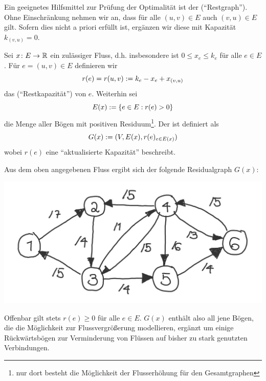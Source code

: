 Ein geeignetes Hilfsmittel zur Prüfung der Optimalität ist der  (\enquote{Restgraph}). Ohne Einschränkung nehmen wir an, dass für alle $(u,v) \in E$ auch $(v,u) \in E$ gilt. Sofern dies nicht a priori erfüllt ist, ergänzen wir diese mit Kapazität $k_{(v,u)} = 0$.

\begin{definition}
	Sei $\abb{x}{E}{\R}$ ein zulässiger Fluss, d.h. insbesondere ist $0 \le x_e \le k_e$ für alle $e \in E$. Für $e = (u,v) \in E$ definieren wir
	\begin{equation*}
		r(e) = r(u,v) \mathrel{:=} k_e - x_e + x_{(v,u)}
	\end{equation*}
	das  (\enquote{Restkapazität}) von $e$.
	Weiterhin sei
	\begin{equation*}
		E(x) \mathrel{:=} \left\{ e \in E : r(e) > 0 \right\}
	\end{equation*}
	die Menge aller Bögen mit positiven Residuum\footnote{nur dort besteht die Möglichkeit der Flusserhöhung für den Gesamtgraphen}. Der  ist definiert als 
	\begin{equation*}
		G(x) \mathrel{:=} (V, E(x), r(e)_{e \in E(x)})
	\end{equation*}
	wobei $r(e)$ eine \enquote{aktualisierte Kapazität} beschreibt.
\end{definition}

\begin{beispiel}
	Aus dem oben angegebenen Fluss ergibt sich der folgende Residualgraph $G(x)$:
	
	\begin{center}
		\includegraphics[width=.5\linewidth]{./optinum_abb/optinum_5_4_bsp5-4.jpg}
	\end{center}

	Offenbar gilt stets $r(e) \ge 0$ für alle $e \in E$. $G(x)$ enthält also all jene Bögen, die die Möglichkeit zur Flussvergrößerung modellieren, ergänzt um einige Rückwärtsbögen zur Verminderung von Flüssen auf bisher zu stark genutzten Verbindungen.
\end{beispiel}

